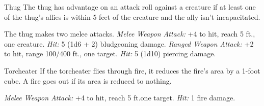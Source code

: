 \documentclass[10pt,a4paper,twoside,twocolumn,openany,bg=print,nodeprecatedcode]{dndbook}
\begin{document}
\begin{DndMonster}[float*=t]{Thug}
\DndMonsterBasics[
armor-class = {11 (leather armor)},
hit-points = {\DndDice{5d8 + 10}},
speed = {30 ft.}
]
\DndMonsterAbilityScores[
 str = 15,
 dex = 11,
 con = 14,
 int = 10,
 wis = 10,
 cha = 11
]
\DndMonsterDetails[
skills = {Intimidation +2},
languages = {any one language (usually Common)},
challenge = 1/2,
]
The thug has advantage on an attack roll against a creature if at least one of the thug's allies is within 5 feet of the creature and the ally isn't incapacitated.
\par
{}
The thug makes two melee attacks.
\textsl{Melee Weapon Attack:} +4 to hit, reach 5 ft., one creature. \textsl{Hit:} 5 (1d6 + 2) bludgeoning damage.
\textsl{Ranged Weapon Attack:} +2 to hit, range 100/400 ft., one target. \textsl{Hit:} 5 (1d10) piercing damage.
\end{DndMonster}



\begin{DndMonster}[float*=t]{Torcheater}
\DndMonsterBasics[
armor-class = {12},
hit-points = {\DndDice{1d4 + 1}},
speed = {5 ft., 30 ft. (key)}
]
\DndMonsterAbilityScores[
 str = 2,
 dex = 14,
 con = 12,
 int = 2,
 wis = 11,
 cha = 6
]
\DndMonsterDetails[
damage-immunities = {fire},
senses = {darkvision 60 ft., passive perception 10},
challenge = 0,
]
If the torcheater flies through fire, it reduces the fire's area by a 1-foot cube. A fire goes out if its area is reduced to nothing.
\par
{}
\textsl{Melee Weapon Attack:} +4 to hit, reach 5 ft.one target. \textsl{Hit:} 1 fire damage.
\end{DndMonster}
\end{document}

